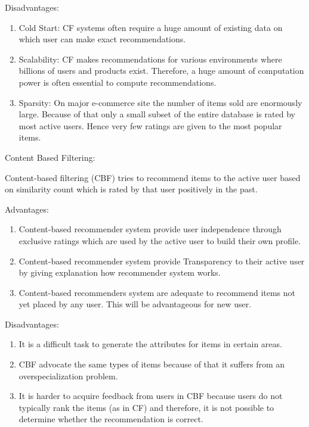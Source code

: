 \documentclass{tcc}
\begin{document}
\begin{flushleft}
Disadvantages:
\end{flushleft}
\begin{enumerate}
    \item Cold Start: CF systems often require a huge amount of existing data on which user can make exact recommendations.
    \item Scalability: CF makes recommendations for various environments where billions of users and products exist. Therefore, a huge amount of computation power is often essential to compute recommendations.
    \item Sparsity: On major e-commerce site the number of items sold are enormously large. Because of that only a small subset of the entire database is rated by most active users. Hence very few ratings are given to the most popular items.
\end{enumerate}
\newpage
\begin{flushleft}
\Large{{\selectfont
Content Based Filtering:
}}
\end{flushleft}
Content-based filtering (CBF) tries to recommend items to the active user based on similarity count which is rated by that user positively in the past.
\begin{flushleft}
Advantages:
\end{flushleft}
\begin{enumerate}
    \item Content-based recommender system provide user independence through exclusive ratings which are used by the active user to build their own profile.
    \item Content-based recommender system provide Transparency to their active user by giving explanation how recommender system works.
    \item Content-based recommenders system are adequate to recommend items not yet placed by any user. This will be advantageous for new user.
\end{enumerate}
\begin{flushleft}
Disadvantages:
\end{flushleft}
\begin{enumerate}
    \item It is a difficult task to generate the attributes for items in certain areas.
    \item CBF advocate the same types of items because of that it suffers from an overspecialization problem.
    \item It is harder to acquire feedback from users in CBF because users do not typically rank the items (as in CF) and therefore, it is not possible to determine whether the recommendation is correct.
\end{enumerate}
\end{document}
